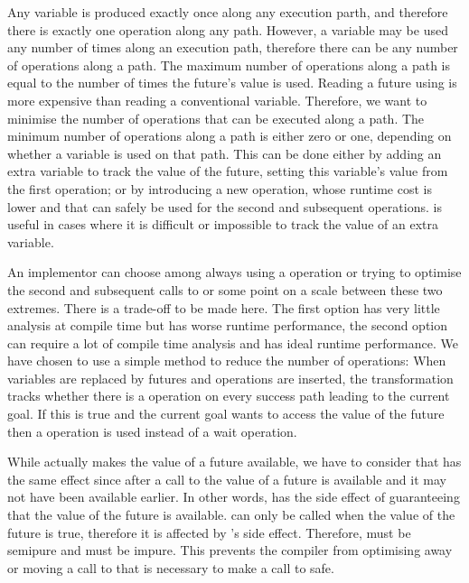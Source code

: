 Any variable is produced exactly once along any execution parth,
and therefore there is exactly one \signal operation along any path.
However, a variable may be used any number of times along an execution path,
therefore there can be any number of \wait operations along a path.
The maximum number of \wait operations along a path is equal to the number
of times the future's value is used.
Reading a future using \wait is more expensive than reading a conventional
variable.
Therefore, we want to minimise the number of \wait operations that can be
executed along a path.
The minimum number of \wait operations along a path is either zero or one,
depending on whether a variable is used on that path.
This can be done either by adding an extra variable to track the value of
the future, setting this variable's value from the first \wait operation;
or by introducing a new operation, \get whose runtime cost is lower
and that can safely be used for the second and subsequent \wait operations.
\get is useful in cases where it is difficult or impossible to track the
value of an extra variable.

An implementor can choose among always using a \wait operation or
trying to optimise the second and subsequent calls to \wait or
some point on a scale between these two extremes.
There is a trade-off to be made here.
The first option has very little analysis at compile time but has worse
runtime performance,
the second option can require a lot of compile time analysis and has ideal
runtime performance.
We have chosen to use a simple method to reduce the number of \wait
operations:
When variables are replaced by futures and \wait operations are inserted,
the transformation tracks whether there is a \wait operation on every success
path leading to the current goal.
If this is true and the current goal wants to access the value of the future
then a \get operation is used instead of a wait operation.

While \signal actually makes the value of a future available,
we have to consider that \wait has the same effect
since after a call to \wait the value of a future is available and it
may not have been available earlier.
In other words,
\wait has the side effect of guaranteeing that the value of the future is
available.
\get can only be called when the value of the future is true,
therefore it is affected by \wait's side effect.
Therefore, \get must be semipure and \wait must be impure.
This prevents the compiler from optimising away or moving a call to \wait
that is necessary to make a call to \get safe.

